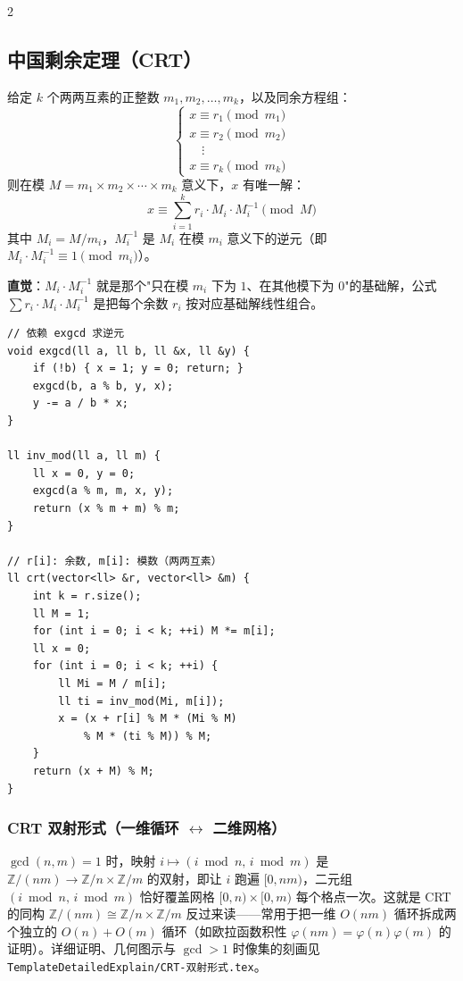 \begin{multicols*}{2}
		\subsection{中国剩余定理（CRT）}

		给定 $k$ 个两两互素的正整数 $m_1, m_2, \dots, m_k$，以及同余方程组：
		\[
			\begin{cases}
				x \equiv r_1 \pmod{m_1} \\
				x \equiv r_2 \pmod{m_2} \\
				\quad \vdots \\
				x \equiv r_k \pmod{m_k}
			\end{cases}
		\]
		则在模 $M = m_1 \times m_2 \times \cdots \times m_k$ 意义下，$x$ 有唯一解：
		$$x \equiv \sum_{i=1}^{k} r_i \cdot M_i \cdot M_i^{-1} \pmod{M}$$
		其中 $M_i = M / m_i$，$M_i^{-1}$ 是 $M_i$ 在模 $m_i$ 意义下的逆元（即 $M_i \cdot M_i^{-1} \equiv 1 \pmod{m_i}$）。

		\textbf{直觉}：$M_i \cdot M_i^{-1}$ 就是那个"只在模 $m_i$ 下为 $1$、在其他模下为 $0$"的基础解，公式 $\sum r_i \cdot M_i \cdot M_i^{-1}$ 是把每个余数 $r_i$ 按对应基础解线性组合。

		\begin{verbatim}
// 依赖 exgcd 求逆元
void exgcd(ll a, ll b, ll &x, ll &y) {
	if (!b) { x = 1; y = 0; return; }
	exgcd(b, a % b, y, x);
	y -= a / b * x;
}

ll inv_mod(ll a, ll m) {
	ll x = 0, y = 0;
	exgcd(a % m, m, x, y);
	return (x % m + m) % m;
}

// r[i]: 余数, m[i]: 模数（两两互素）
ll crt(vector<ll> &r, vector<ll> &m) {
	int k = r.size();
	ll M = 1;
	for (int i = 0; i < k; ++i) M *= m[i];
	ll x = 0;
	for (int i = 0; i < k; ++i) {
		ll Mi = M / m[i];
		ll ti = inv_mod(Mi, m[i]);
		x = (x + r[i] % M * (Mi % M)
			% M * (ti % M)) % M;
	}
	return (x + M) % M;
}
		\end{verbatim}

		\subsubsection{CRT 双射形式（一维循环 $\leftrightarrow$ 二维网格）}

		$\gcd(n, m) = 1$ 时，映射 $i \mapsto (i \bmod n,\, i \bmod m)$ 是 $\mathbb{Z}/(nm) \to \mathbb{Z}/n \times \mathbb{Z}/m$ 的双射，即让 $i$ 跑遍 $[0, nm)$，二元组 $(i \bmod n,\, i \bmod m)$ 恰好覆盖网格 $[0, n) \times [0, m)$ 每个格点一次。这就是 CRT 的同构 $\mathbb{Z}/(nm) \cong \mathbb{Z}/n \times \mathbb{Z}/m$ 反过来读——常用于把一维 $O(nm)$ 循环拆成两个独立的 $O(n) + O(m)$ 循环（如欧拉函数积性 $\varphi(nm) = \varphi(n)\varphi(m)$ 的证明）。详细证明、几何图示与 $\gcd > 1$ 时像集的刻画见 \texttt{TemplateDetailedExplain/CRT-双射形式.tex}。


\end{multicols*}
